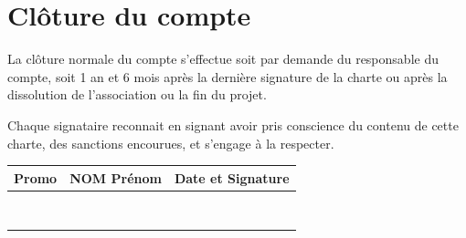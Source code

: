 \documentclass[12pt, a4paper]{article}
\begin{document}
\section{Clôture du compte}
La clôture normale du compte s'effectue soit par demande du responsable du compte, soit 1 an et 6 mois après la dernière signature de la charte ou après la dissolution de l'association ou la fin du projet.

\vspace*{1cm}

\noindent Chaque signataire reconnait en signant avoir pris conscience du contenu de cette charte, des sanctions encourues, et s'engage à la respecter.

\vspace*{0.5cm}

\begin{table}[h]
	\centering
	\renewcommand{\arraystretch}{2}
	\small{
		\begin{tabular}{|p{1.5cm}|p{7cm}|p{6cm}|}
			\hline
			\rowcolor{black!10} Promo & NOM Prénom & Date et Signature \\
			\hline
			                          &            &                   \\
			\hline
			                          &            &                   \\
			\hline
			                          &            &                   \\
			\hline
			                          &            &                   \\
			\hline
			                          &            &                   \\
			\hline
			                          &            &                   \\
			\hline
			                          &            &                   \\
			\hline
			                          &            &                   \\
			\hline
		\end{tabular}
	}
\end{table}
\end{document}
